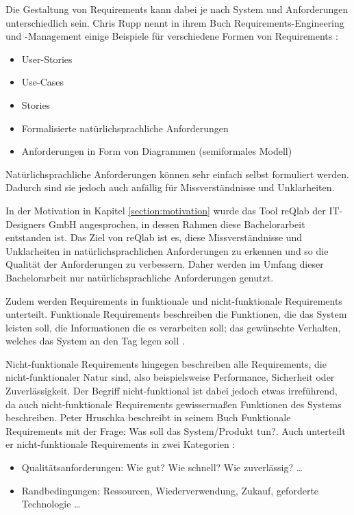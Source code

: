     \newpage

    Die Gestaltung von Requirements kann dabei je nach System und Anforderungen unterschiedlich sein. Chris Rupp nennt in ihrem Buch \glqq{}Requirements-Engineering und -Management\grqq{} einige Beispiele für verschiedene Formen von Requirements \autocite[][S. 19]{Rupp2014}:
    \begin{itemize}
        \item User-Stories
        \item Use-Cases
        \item Stories
        \item Formalisierte natürlichsprachliche Anforderungen
        \item Anforderungen in Form von Diagrammen (semiformales Modell)
    \end{itemize}

    
    Natürlichsprachliche Anforderungen können sehr einfach selbst formuliert werden.
    Dadurch sind sie jedoch auch anfällig für Missverständnisse und Unklarheiten.

    In der Motivation in Kapitel \ref{section:motivation} wurde das Tool reQlab der IT-Designers GmbH angesprochen, in dessen Rahmen diese Bachelorarbeit entstanden ist.
    Das Ziel von reQlab ist es, diese Missverständnisse und Unklarheiten in natürlichsprachlichen Anforderungen zu erkennen und so die Qualität der Anforderungen zu verbessern.
    Daher werden im Umfang dieser Bachelorarbeit nur natürlichsprachliche Anforderungen genutzt.

    Zudem werden Requirements in funktionale und nicht-funktionale Requirements unterteilt.
    Funktionale Requirements beschreiben \glqq{}die Funktionen, die das System leisten soll, die Informationen die es verarbeiten soll; das gewünschte Verhalten, welches das System an den Tag legen soll\grqq{} \autocite[][S. 12]{Hruschka2023}.

    Nicht-funktionale Requirements hingegen beschreiben alle Requirements, die nicht-funktionaler Natur sind, also beispielsweise Performance, Sicherheit oder Zuverlässigkeit.
    Der Begriff nicht-funktional ist dabei jedoch etwas irreführend, da auch nicht-funktionale Requirements gewissermaßen Funktionen des Systems beschreiben.
    Peter Hruschka beschreibt in seinem Buch Funktionale Requirements mit der Frage: \glqq{}Was soll das System/Produkt tun?\grqq{}.
    Auch unterteilt er nicht-funktionale Requirements in zwei Kategorien \autocite[][S. 13]{Hruschka2023}:
    \begin{itemize}
      \item Qualitätsanforderungen: \glqq{}Wie gut? Wie schnell? Wie zuverlässig? \ldots\grqq{}
      \item Randbedingungen: \glqq{}Ressourcen, Wiederverwendung, Zukauf, geforderte Technologie \ldots\grqq{}
    \end{itemize}
    
